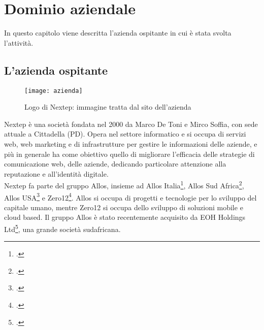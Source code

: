 
\chapter{Dominio aziendale}
\label{cap:introduzione}
In questo capitolo viene descritta l’azienda ospitante in cui è stata
svolta l’attività.






\section{L'azienda ospitante}
\begin{figure}[!h] 
	\centering 
	\texttt{[image: azienda]} 
	\caption{Logo di Nextep: immagine tratta dal sito dell’azienda}
\end{figure}
Nextep è una società fondata nel 2000 da Marco De Toni e Mirco Soffia, con sede
attuale a Cittadella (PD).
Opera nel settore informatico e si occupa di servizi web, web marketing e di infrastrutture
per gestire le informazioni delle aziende, e più in generale ha come obiettivo
quello di migliorare l’efficacia delle strategie di comunicazione web, delle aziende,
dedicando particolare attenzione alla reputazione e all’identità digitale. 
\\

Nextep fa parte del gruppo Allos, insieme ad Allos Italia\footcite{https://www.allos.it/}, Allos Sud Africa\footcite{http://www.allos.co.za/}, Allos
USA\footcite{http://www.allosamerica.com/} e Zero12\footcite{http://www.zero12.it/}.
Allos si occupa di progetti e tecnologie per lo sviluppo del capitale umano, mentre
Zero12 si occupa dello sviluppo di soluzioni mobile e cloud based.
Il gruppo Allos è stato recentemente acquisito da EOH Holdings Ltd\footcite{http://www.eoh.co.za/}, una grande
società sudafricana.
\\

